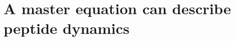 \chapter{A master equation can describe peptide dynamics}
\label{chapter:mastereqn-alanine-long-times}



